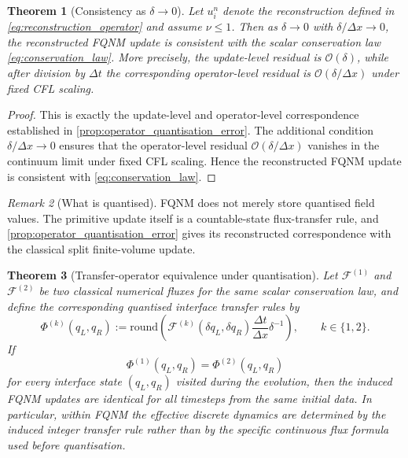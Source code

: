 \documentclass[sn-basic]{sn-jnl}
\theoremstyle{plain}
\newtheorem{theorem}{Theorem}[section]
\theoremstyle{remark}
\newtheorem{remark}[theorem]{Remark}
\begin{document}
%
%
\begin{theorem}[Consistency as $\delta \to 0$]
\label{thm:consistency}
Let $u_i^n$ denote the reconstruction defined in \cref{eq:reconstruction_operator} and assume $\nu \le 1$. Then as $\delta \to 0$ with $\delta/\Delta x \to 0$, the reconstructed FQNM update is consistent with the scalar conservation law \cref{eq:conservation_law}. More precisely, the update-level residual is $\mathcal{O}(\delta)$, while after division by $\Delta t$ the corresponding operator-level residual is $\mathcal{O}(\delta/\Delta x)$ under fixed CFL scaling.
\end{theorem}

\begin{proof}
This is exactly the update-level and operator-level correspondence established in \cref{prop:operator_quantisation_error}. The additional condition $\delta/\Delta x\to0$ ensures that the operator-level residual $\mathcal O(\delta/\Delta x)$ vanishes in the continuum limit under fixed CFL scaling. Hence the reconstructed FQNM update is consistent with \cref{eq:conservation_law}.
\end{proof}




\begin{remark}[What is quantised]
\label{rem:what_is_quantised}
FQNM does not merely store quantised field values. The primitive update itself is a countable-state flux-transfer rule, and \cref{prop:operator_quantisation_error} gives its reconstructed correspondence with the classical split finite-volume update.
\end{remark}

\begin{theorem}[Transfer-operator equivalence under quantisation]
\label{thm:transfer_operator_equivalence}
Let $\mathcal F^{(1)}$ and $\mathcal F^{(2)}$ be two classical numerical fluxes for the same scalar conservation law, and define the corresponding quantised interface transfer rules by
\begin{equation}
\Phi^{(k)}(q_L,q_R)
:=
\mathrm{round}\!\left(
\mathcal F^{(k)}(\delta q_L,\delta q_R)
\frac{\Delta t}{\Delta x}\delta^{-1}
\right),
\qquad k\in\{1,2\}.
\label{eq:transfer_operator_equivalence_definition}
\end{equation}
If
\begin{equation}
\Phi^{(1)}(q_L,q_R)=\Phi^{(2)}(q_L,q_R)
\label{eq:transfer_operator_equivalence_condition}
\end{equation}
for every interface state $(q_L,q_R)$ visited during the evolution, then the induced FQNM updates are identical for all timesteps from the same initial data. In particular, within FQNM the effective discrete dynamics are determined by the induced integer transfer rule rather than by the specific continuous flux formula used before quantisation.
\end{theorem}
\end{document}

